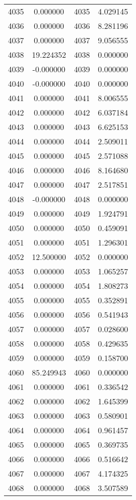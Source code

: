 \documentclass[12pt]{article}
\begin{document}
\begin{longtable}{@{}cccc@{}}
4035 & 0.000000 & 4035 & 4.029145 \\
4036 & 0.000000 & 4036 & 8.281196 \\
4037 & 0.000000 & 4037 & 9.056555 \\
4038 & 19.224352 & 4038 & 0.000000 \\
4039 & -0.000000 & 4039 & 0.000000 \\
4040 & -0.000000 & 4040 & 0.000000 \\
4041 & 0.000000 & 4041 & 8.006555 \\
4042 & 0.000000 & 4042 & 6.037184 \\
4043 & 0.000000 & 4043 & 6.625153 \\
4044 & 0.000000 & 4044 & 2.509011 \\
4045 & 0.000000 & 4045 & 2.571088 \\
4046 & 0.000000 & 4046 & 8.164680 \\
4047 & 0.000000 & 4047 & 2.517851 \\
4048 & -0.000000 & 4048 & 0.000000 \\
4049 & 0.000000 & 4049 & 1.924791 \\
4050 & 0.000000 & 4050 & 0.459091 \\
4051 & 0.000000 & 4051 & 1.296301 \\
4052 & 12.500000 & 4052 & 0.000000 \\
4053 & 0.000000 & 4053 & 1.065257 \\
4054 & 0.000000 & 4054 & 1.808273 \\
4055 & 0.000000 & 4055 & 0.352891 \\
4056 & 0.000000 & 4056 & 0.541943 \\
4057 & 0.000000 & 4057 & 0.028600 \\
4058 & 0.000000 & 4058 & 0.429635 \\
4059 & 0.000000 & 4059 & 0.158700 \\
4060 & 85.249943 & 4060 & 0.000000 \\
4061 & 0.000000 & 4061 & 0.336542 \\
4062 & 0.000000 & 4062 & 1.645399 \\
4063 & 0.000000 & 4063 & 0.580901 \\
4064 & 0.000000 & 4064 & 0.961457 \\
4065 & 0.000000 & 4065 & 0.369735 \\
4066 & 0.000000 & 4066 & 0.516642 \\
4067 & 0.000000 & 4067 & 4.174325 \\
4068 & 0.000000 & 4068 & 3.507589 \\

\end{longtable}
\end{document}
